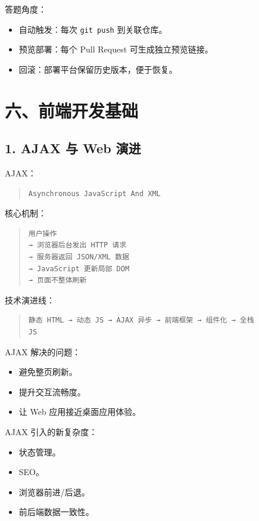 \documentclass[UTF8,zihao=-4]{ctexart}
\begin{document}
答题角度：

\begin{itemize}
\item 自动触发：每次 \texttt{git push} 到关联仓库。
\item 预览部署：每个 Pull Request 可生成独立预览链接。
\item 回滚：部署平台保留历史版本，便于恢复。
\end{itemize}

\section{六、前端开发基础}

\subsection{1. AJAX 与 Web 演进}

AJAX：

\begin{quote}
\footnotesize
\begin{verbatim}
Asynchronous JavaScript And XML
\end{verbatim}
\end{quote}

核心机制：

\begin{quote}
\footnotesize
\begin{verbatim}
用户操作
→ 浏览器后台发出 HTTP 请求
→ 服务器返回 JSON/XML 数据
→ JavaScript 更新局部 DOM
→ 页面不整体刷新
\end{verbatim}
\end{quote}

技术演进线：

\begin{quote}
\footnotesize
\begin{verbatim}
静态 HTML → 动态 JS → AJAX 异步 → 前端框架 → 组件化 → 全栈 
JS
\end{verbatim}
\end{quote}

AJAX 解决的问题：

\begin{itemize}
\item 避免整页刷新。
\item 提升交互流畅度。
\item 让 Web 应用接近桌面应用体验。
\end{itemize}

AJAX 引入的新复杂度：

\begin{itemize}
\item 状态管理。
\item SEO。
\item 浏览器前进/后退。
\item 前后端数据一致性。
\end{itemize}
\end{document}
